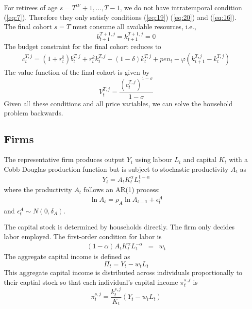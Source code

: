 \documentclass[12pt]{article}
\begin{document}
For retirees of age $s=T^W+1,...,T-1$, we do not have intratemporal condition (\ref{eq:7}). Therefore they only satisfy conditions (\ref{eq:19}) (\ref{eq:20}) and (\ref{eq:16}). The final cohort $s=T$ must consume all available resources, i.e., 
\begin{equation*}
b_{t+1}^{T+1,j} = k_{t+1}^{T+1,j} =0
\end{equation*}
The budget constraint for the final cohort reduces to
\begin{equation}
\begin{split}	
c_{t}^{T,j}=(1+r_t^b)b_{t}^{T,j}+r_t^k k_{t}^{T,j}+(1-\delta)k_{t}^{T,j}+pen_t-\varphi(k_{t+1}^{T,j}-k_{t}^{T,j}) \label{eq:18}
\end{split}
\end{equation}
The value function of the final cohort is given by 
\begin{equation}
V_t^{T,j} = \frac{(c_{t}^{T,j})^{1-\sigma}}{1-\sigma}
\end{equation}
Given all these conditions and all price variables, we can solve the household problem backwards. 


\subsection{Firms}
The representative firm produces output $Y_t$ using labour $L_t$ and capital $K_t$ with a Cobb-Douglas production function but is subject to stochastic productivity $A_t$ as
\begin{eqnarray}
Y_t=A_tK_t^\alpha L_t^{1-\alpha} \label{eq:10}
\end{eqnarray}
where the productivity $A_t$ follows an AR(1) process: 
\begin{eqnarray}
\ln A_t=\rho_A \ln A_{t-1}+\epsilon^A_t \label{eq:11}
\end{eqnarray}
and $\epsilon^A_t \sim N(0,\delta_A)$.

The capital stock is determined by households directly. The firm only decides labor employed. The first-order condition for labor is  
\begin{eqnarray}
(1-\alpha)A_tK_t^{\alpha}L_t^{-\alpha} &=& w_t \label{eq:13}
\end{eqnarray}
The aggregate capital income is defined as
\[ \Pi_t= Y_t-w_tL_t\]
This aggregate capital income is distributed across individuals proportionally to their captial stock so that each individual's capital income $\pi_t^{s,j}$ is
\[\pi_t^{s,j}=\frac{k_{t}^{s,j}}{K_t}(Y_t-w_tL_t) \]
\end{document}
